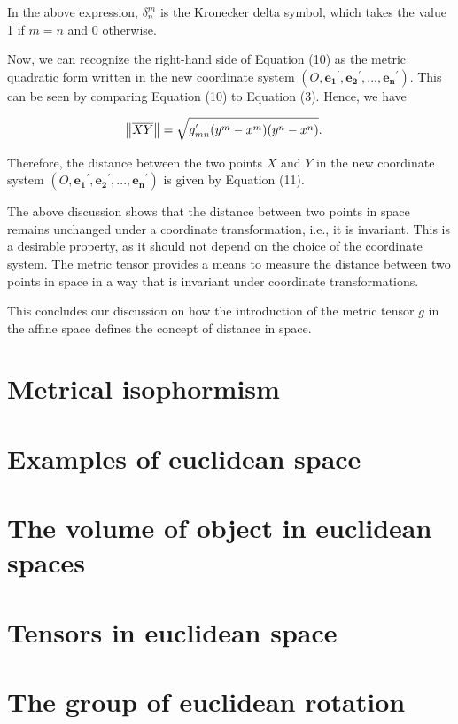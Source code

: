 \documentclass{book}
\begin{document}
In the above expression, $\delta^{m}_{n}$ is the Kronecker delta symbol, which takes the value 1 if $m=n$ and 0 otherwise.

Now, we can recognize the right-hand side of Equation (10) as the metric quadratic form written in the new coordinate system $(O, \boldsymbol{e_1}^{'}, \boldsymbol{e_2}^{'}, ..., \boldsymbol{e_n}^{'})$. This can be seen by comparing Equation (10) to Equation (3). Hence, we have

\begin{align}
\norm{\overline{XY}} &= \sqrt{g^{'}_{mn} (y^{m} - x^{m})(y^{n} - x^{n})}. \label{distance_in_new_coordinate_system}
\end{align}

Therefore, the distance between the two points $X$ and $Y$ in the new coordinate system $(O, \boldsymbol{e_1}^{'}, \boldsymbol{e_2}^{'}, ..., \boldsymbol{e_n}^{'})$ is given by Equation (11).

The above discussion shows that the distance between two points in space remains unchanged under a coordinate transformation, i.e., it is invariant. This is a desirable property, as it should not depend on the choice of the coordinate system. The metric tensor provides a means to measure the distance between two points in space in a way that is invariant under coordinate transformations.

This concludes our discussion on how the introduction of the metric tensor $g$ in the affine space defines the concept of distance in space.

\section{Metrical isophormism}

\section{Examples of euclidean space}

\section{The volume of object in euclidean spaces}

\section{Tensors in euclidean space}

\section{The group of euclidean rotation}
\end{document}

